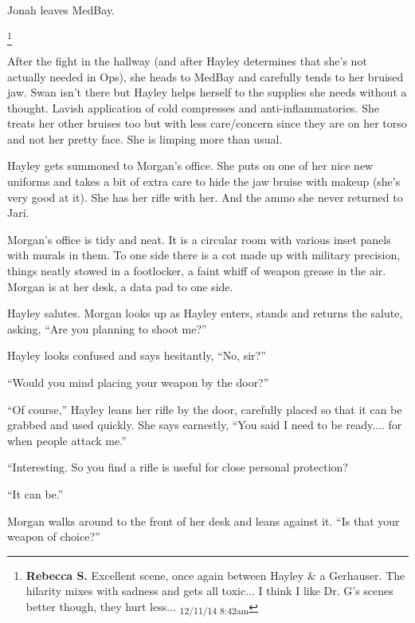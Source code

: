 Jonah leaves MedBay.




\footnote{\textbf{Rebecca S. }Excellent scene, once again between Hayley \& a Gerhauser.  The hilarity mixes with sadness and gets all toxic... I think I like Dr. G's scenes better though, they hurt less... \textsubscript{12/11/14 8:42am}}

After the fight in the hallway (and after Hayley determines that she's not actually needed in Ops), she heads to MedBay and carefully tends to her bruised jaw.  Swan isn't there but Hayley helps herself to the supplies she needs without a thought.  Lavish application of cold compresses and anti-inflammatories.  She treats her other bruises too but with less care/concern since they are on her torso and not her pretty face.  She is limping more than usual.



Hayley gets summoned to Morgan's office.  She puts on one of her nice new uniforms and takes a bit of extra care to hide the jaw bruise with makeup (she's very good at it).  She has her rifle with her.  And the ammo she never returned to Jari.



Morgan's office is tidy and neat.  It is a circular room with various inset panels with murals in them.  To one side there is a cot made up with military precision, things neatly stowed in a footlocker, a faint whiff of weapon grease in the air.  Morgan is at her desk, a data pad to one side.



Hayley salutes.  Morgan looks up as Hayley enters, stands and returns the salute, asking, ``Are you planning to shoot me?''

Hayley looks confused and says hesitantly, ``No, sir?''

``Would you mind placing your weapon by the door?''

``Of course,'' Hayley leans her rifle by the door, carefully placed so that it can be grabbed and used quickly.  She says earnestly, ``You said I need to be ready.... for when people attack me.''

``Interesting.  So you find a rifle is useful for close personal protection?

``It can be.''

Morgan walks around to the front of her desk and leans against it.  ``Is that your weapon of choice?''

